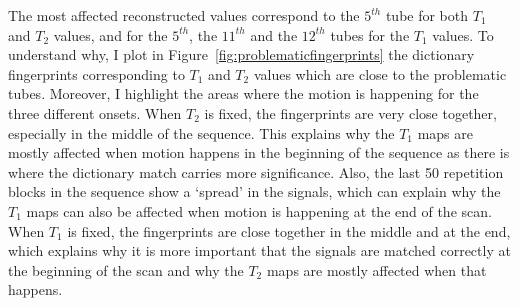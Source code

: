 The most affected reconstructed values correspond to the $5^{th}$ tube for both $T_1$ and $T_2$ values, and for the $5^{th}$, the $11^{th}$ and the $12^{th}$ tubes for the $T_1$ values.
To understand why, I plot in Figure~\ref{fig:problematicfingerprints} the dictionary fingerprints corresponding to $T_1$ and $T_2$ values which are close to the problematic tubes.
Moreover, I highlight the areas where the motion is happening for the three different onsets.
When $T_2$ is fixed, the fingerprints are very close together, especially in the middle of the sequence.
This explains why the $T_1$ maps are mostly affected when motion happens in the beginning of the sequence as there is where the dictionary match carries more significance.
Also, the last 50 repetition blocks in the sequence show a `spread' in the signals, which can explain why the $T_1$ maps can also be affected when motion is happening at the end of the scan.
When $T_1$ is fixed, the fingerprints are close together in the middle and at the end, which explains why it is more important that the signals are matched correctly at the beginning of the scan and why the $T_2$ maps are mostly affected when that happens.

